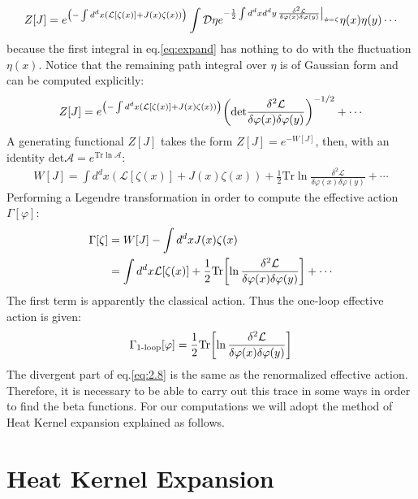 \begin{align}
    Z[J] = e^ {\qty (-\int d^{d}x (\mathcal {L} [\zeta (x)] + J(x) \zeta (x)))} \int \mathcal {D} \eta e^{- \frac{1}{2} \int d^{d}x d^{d}y \eval {\frac{\delta ^{2} \mathcal{L}}{\delta \varphi(x) \delta \varphi(y)}} _{\phi = \zeta}} \eta(x)\eta(y) \cdots
\end{align}
because the first integral in eq.\ref{eq:expand} has nothing to do with the fluctuation $\eta(x)$. Notice that the remaining path integral over $\eta$ is of Gaussian form and can be computed explicitly:
\begin{align}
    Z[J] = e^ {\qty (-\int d^{d}x (\mathcal {L} [\zeta (x)] + J(x) \zeta (x)))} \qty (\text{det} \frac{\delta ^{2} \mathcal{L}}{\delta \varphi(x) \delta \varphi(y)})^{-1/2} + \cdots
\end{align}
A generating functional $Z[J]$ takes the form $Z[J] = e^{-W[J]}$, then, with an identity $\text{det} \mathcal{A} = e^{\text{Tr} \ln \mathcal{A}}$:
\begin{align}
    W[J] = \int d^{d}x (\mathcal {L} [\zeta (x)] + J(x) \zeta (x)) + \frac{1}{2} \text{Tr} \ln \frac{\delta ^{2} \mathcal{L}}{\delta \varphi(x) \delta \varphi(y)} + \cdots
\end{align}
Performing a Legendre transformation in order to compute the effective action $\Gamma[\varphi]$:
\begin{align}
    \Gamma[\zeta] &= W[J] - \int d^{d} x J(x)\zeta(x) \nonumber \\
    & = \int d^{d}x \mathcal{L} [\zeta(x)] + \frac{1}{2} \text{Tr} \qty[\ln \frac{\delta ^{2} \mathcal{L}}{\delta \varphi(x) \delta \varphi(y)}] + \cdots
\end{align}
The first term is apparently the classical action. Thus the one-loop effective action is given:
\begin{align}
    \label{eq:2.8}
    \Gamma_{\text{1-loop}} [\varphi] = \frac{1}{2} \text{Tr} \qty[\ln \frac{\delta ^{2} \mathcal{L}}{\delta \varphi(x) \delta \varphi(y)}]
\end{align}
The divergent part of eq.\ref{eq:2.8} is the same as the renormalized effective action. Therefore, it is necessary to be able to carry out this trace in some ways in order to find the beta functions. For our computations we will adopt the method of Heat Kernel expansion explained as follows. 

\section{Heat Kernel Expansion}
